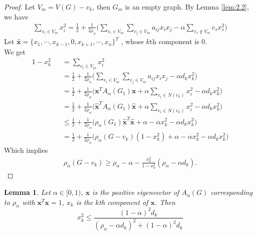 \documentclass[amsthm]{elsart}
\newtheorem{lemma}{Lemma}[section]
\begin{document}
\begin{proof}
Let $V_m = V(G) - v_k$, then $G_m$ is an empty graph. By Lemma \ref{lem:2.2}, we have
\begin{eqnarray*}
\sum \limits_{v_i \in V_m}^{} x_i^2
= \frac{1}{2} + \frac{1}{2 \rho_\alpha} \Big( \sum \limits_{v_i \in V_m}^{} \sum \limits_{v_j \in V_m}^{} a_{ij} x_i x_j - \alpha \sum \limits_{v_s \notin V_m}^{} c_s x_s^2 \Big)
\end{eqnarray*}
Let $\hat{\textbf{x}} = \{x_1, \cdots, x_{k-1}, 0, x_{k+1}, \cdots, x_n\}^T$ , whose $k$th component is 0. \\
We get
\begin{eqnarray*}
1 - x_k^2
&&= \sum \limits_{v_i \in V_m}^{} x_i^2
\\ &&= \frac{1}{2} + \frac{1}{2 \rho_\alpha} \Big( \sum \limits_{v_i \in V_m}^{} \sum \limits_{v_j \in V_m}^{} a_{ij} x_i x_j - \alpha d_k x_k^2 \Big)
\\ &&= \frac{1}{2} + \frac{1}{2 \rho_\alpha} \Big( \textbf{x}^T A_\alpha(G_1) \textbf{x} + \alpha \sum \limits_{v_i \in N(v_k)}^{} x_i^2 - \alpha d_k x_k^2 \Big)
\\ &&= \frac{1}{2} + \frac{1}{2 \rho_\alpha} \Big( \hat{\textbf{x}}^T A_\alpha(G_1) \hat{\textbf{x}} + \alpha \sum \limits_{v_i \in N(v_k)}^{} x_i^2 - \alpha d_k x_k^2 \Big)
\\ &&\leqslant \frac{1}{2} + \frac{1}{2 \rho_\alpha} \Big( \rho_\alpha (G_1) \hat{\textbf{x}}^T \hat{\textbf{x}} + \alpha - \alpha  x_k^2 - \alpha d_k x_k^2 \Big)
\\ &&= \frac{1}{2} + \frac{1}{2 \rho_\alpha} \Big( \rho_\alpha (G - v_k) (1 - x_k^2) + \alpha - \alpha  x_k^2 - \alpha d_k x_k^2 \Big)
\end{eqnarray*}
Which implies
\begin{eqnarray*}
  \rho_\alpha (G - v_k) \geqslant \rho_\alpha - \alpha - \frac{x_k^2}{1 - x_k^2} ( \rho_\alpha - \alpha d_k).
\end{eqnarray*}
\end{proof}

\begin{lemma} \label{lem:3}
Let $\alpha \in [0, 1)$, $\textbf{x}$ is the positive eigenvector of $A_\alpha (G)$ corresponding to $\rho _\alpha$  with $\textbf{x}^T \textbf{x} = 1$, $x_k$ is the $k$th component of $\textbf{x}$. Then \\
\begin{equation} \label{equ:14}
x_k^2 \leqslant \frac{(1 - \alpha)^2 d_k}{(\rho _\alpha - \alpha d_k)^2 + (1 - \alpha)^2 d_k}
\end{equation}
\end{lemma}
\end{document}
